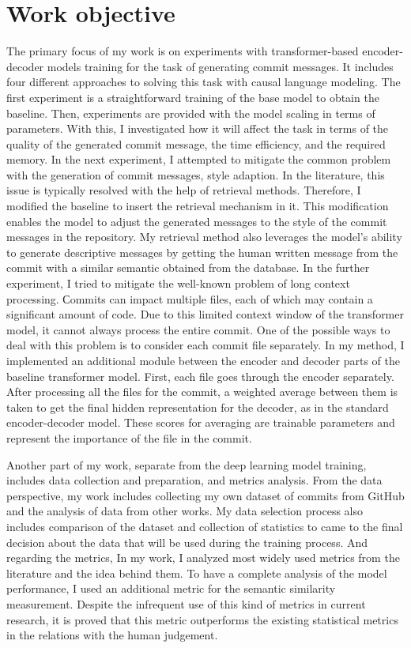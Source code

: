 \section{Work objective}
The primary focus of my work is on experiments with transformer-based encoder-decoder models training for the task of generating commit messages. It includes four different approaches to solving this task with causal language modeling.
The first experiment is a straightforward training of the base model to obtain the baseline. Then, experiments are provided with the model scaling in terms of parameters. With this, I investigated how it will affect the task in terms of the quality of the generated commit message, the time efficiency, and the required memory. 
In the next experiment, I attempted to mitigate the common problem with the generation of commit messages, style adaption. In the literature, this issue is typically resolved with the help of retrieval methods. Therefore, I modified the baseline to insert the retrieval mechanism in it. This modification enables the model to adjust the generated messages to the style of the commit messages in the repository. My retrieval method also leverages the model's ability to generate descriptive messages by getting the human written message from the commit with a similar semantic obtained from the database. 
In the further experiment, I tried to mitigate the well-known problem of long context processing. Сommits can impact multiple files, each of which may contain a significant amount of code. Due to this limited context window of the transformer model, it cannot always process the entire commit. One of the possible ways to deal with this problem is to consider each commit file separately. In my method, I implemented an additional module between the encoder and decoder parts of the baseline transformer model. First, each file goes through the encoder separately. After processing all the files for the commit, a weighted average between them is taken to get the final hidden representation for the decoder, as in the standard encoder-decoder model. These scores for averaging are trainable parameters and represent the importance of the file in the commit. 

Another part of my work, separate from the deep learning model training, includes data collection and preparation, and metrics analysis. From the data perspective, my work includes collecting my own dataset of commits from GitHub and the analysis of data from other works. My data selection process also includes comparison of the dataset and collection of statistics to came to the final decision about the data that will be used during the training process. 
And regarding the metrics, In my work, I analyzed most widely used metrics from the literature and the idea behind them. To have a complete analysis of the model performance, I used an additional metric for the semantic similarity measurement. Despite the infrequent use of this kind of metrics in current research, it is proved that this metric outperforms the existing statistical metrics in the relations with the human judgement.  